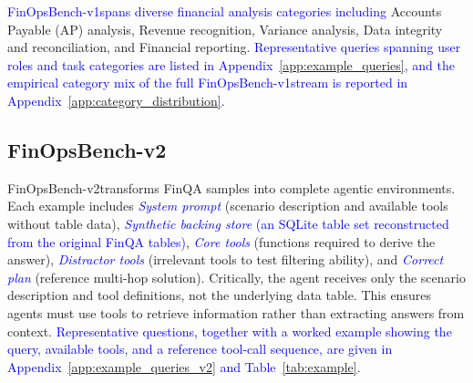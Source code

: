 \documentclass[11pt]{article}
\newcommand{\edit}[1]{\textcolor{blue}{#1}}
\newcommand{\synthsubset}{FinOpsBench-v1}\xspace
\newcommand{\groundedfinqa}{FinOpsBench-v2}\xspace
\begin{document}
\edit{\synthsubset spans diverse financial analysis categories including} Accounts Payable (AP) analysis, Revenue recognition, Variance analysis, Data integrity and reconciliation, and Financial reporting.
\edit{Representative queries spanning user roles and task categories are listed in Appendix~\ref{app:example_queries}, and the empirical category mix of the full \synthsubset stream is reported in Appendix~\ref{app:category_distribution}.}

\subsection{\groundedfinqa}
\label{sec:groundedfinqa}

\groundedfinqa transforms FinQA samples into complete agentic environments. Each example includes \edit{\emph{System prompt}} (scenario description and available tools without table data), \edit{\emph{Synthetic backing store} (an SQLite \citep{owens2010sqlite} table set reconstructed from the original FinQA tables)}, \edit{\emph{Core tools}} (functions required to derive the answer),  \edit{\emph{Distractor tools}} (irrelevant tools to test filtering ability), and \edit{\emph{Correct plan}} (reference multi-hop solution).
Critically, the agent receives only the scenario description and tool definitions, not the underlying data table. This ensures agents must use tools to retrieve information rather than extracting answers from context.
\edit{Representative questions, together with a worked example showing the query, available tools, and a reference tool-call sequence, are given in Appendix~\ref{app:example_queries_v2} and Table~\ref{tab:example}.}
\end{document}
